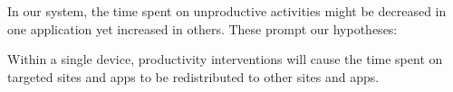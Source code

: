 In our system, the time spent on unproductive activities might be decreased in one application yet increased in others. These prompt our hypotheses:

\begin{hyp} \label{hyp:within}
Within a single device, productivity interventions will cause the time spent on targeted sites and apps to be redistributed to other sites and apps. 
\end{hyp}






